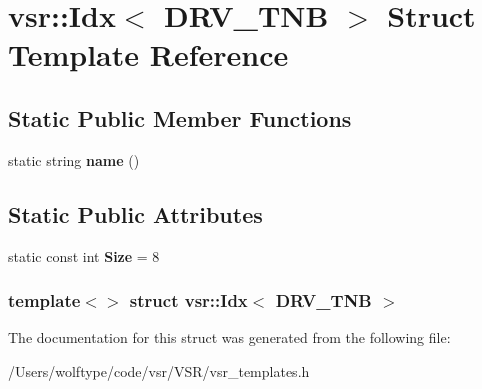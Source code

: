 \hypertarget{structvsr_1_1_idx_3_01_d_r_v___t_n_b_01_4}{\section{vsr\-:\-:Idx$<$ D\-R\-V\-\_\-\-T\-N\-B $>$ Struct Template Reference}
\label{structvsr_1_1_idx_3_01_d_r_v___t_n_b_01_4}
}
\subsection*{Static Public Member Functions}
\begin{DoxyCompactItemize}
\item 
\hypertarget{structvsr_1_1_idx_3_01_d_r_v___t_n_b_01_4_a0cb421c37038a17b81a4e4a130f99b78}{static string {\bfseries name} ()}\label{structvsr_1_1_idx_3_01_d_r_v___t_n_b_01_4_a0cb421c37038a17b81a4e4a130f99b78}

\end{DoxyCompactItemize}
\subsection*{Static Public Attributes}
\begin{DoxyCompactItemize}
\item 
\hypertarget{structvsr_1_1_idx_3_01_d_r_v___t_n_b_01_4_a393b2a19f74527884e5445fb8dcafc1d}{static const int {\bfseries Size} = 8}\label{structvsr_1_1_idx_3_01_d_r_v___t_n_b_01_4_a393b2a19f74527884e5445fb8dcafc1d}

\end{DoxyCompactItemize}
\subsubsection*{template$<$$>$ struct vsr\-::\-Idx$<$ D\-R\-V\-\_\-\-T\-N\-B $>$}



The documentation for this struct was generated from the following file\-:\begin{DoxyCompactItemize}
\item 
/\-Users/wolftype/code/vsr/\-V\-S\-R/vsr\-\_\-templates.\-h\end{DoxyCompactItemize}
